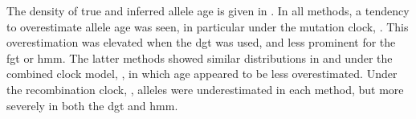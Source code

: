 

%

%

The density of true and inferred allele age is given in .
In all  methods, a tendency to overestimate allele age was seen, in particular under the mutation clock, \ClockM.
This overestimation was elevated when the \gls{dgt} was used, and less prominent for the \gls{fgt} or \gls{hmm}.
The latter methods showed similar distributions in \ClockM and under the combined clock model, \ClockC, in which age appeared to be less overestimated.
Under the recombination clock, \ClockR, alleles were underestimated in each method, but more severely in both the \gls{dgt} and \gls{hmm}.

